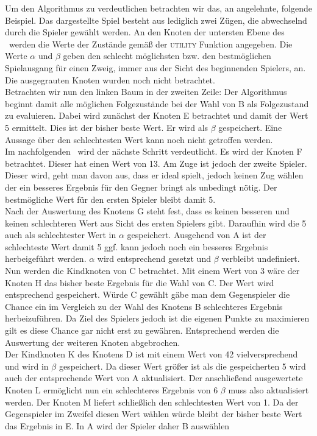 Um den Algorithmus zu verdeutlichen betrachten wir das, an \cite{Russell.2016} angelehnte, folgende Beispiel. Das dargestellte Spiel besteht aus lediglich zwei Zügen, die abwechselnd durch die Spieler gewählt werden. An den Knoten der untersten Ebene des \gtree\ werden die Werte der Zustände gemäß der \textsc{utility} Funktion angegeben. Die Werte $\alpha$ und $\beta$ geben den schlecht möglichsten bzw. den bestmöglichen Spielausgang für einen Zweig, immer aus der Sicht des beginnenden Spielers, an. Die ausgegrauten Knoten wurden noch nicht betrachtet.\\
Betrachten wir nun den linken Baum in der zweiten Zeile: Der Algorithmus beginnt damit alle möglichen Folgezustände bei der Wahl von B als Folgezustand zu evaluieren. Dabei wird zunächst der Knoten E betrachtet und damit der Wert 5 ermittelt. Dies ist der bisher beste Wert. Er wird als $\beta$ gespeichert. Eine Aussage über den schlechtesten Wert kann noch nicht getroffen werden.\\
Im nachfolgenden \gtree\ wird der nächste Schritt verdeutlicht. Es wird der Knoten F betrachtet. Dieser hat einen Wert von 13. Am Zuge ist jedoch der zweite Spieler. Dieser wird, geht man davon aus, dass er ideal spielt, jedoch keinen Zug wählen der ein besseres Ergebnis für den Gegner bringt als unbedingt nötig. Der bestmögliche Wert für den ersten Spieler bleibt damit 5.\\
Nach der Auswertung des Knotens G steht fest, dass es keinen besseren und keinen schlechteren Wert aus Sicht des ersten Spielers gibt. Daraufhin wird die 5 auch als schlechtester Wert in $\alpha$ gespeichert. Ausgehend von A  ist der schlechteste Wert damit 5 ggf. kann jedoch noch ein besseres Ergebnis herbeigeführt werden. $\alpha$ wird entsprechend gesetzt und $\beta$ verbleibt undefiniert.\\
Nun werden die Kindknoten von C betrachtet. Mit einem Wert von 3 wäre der Knoten H das bisher beste Ergebnis für die Wahl von C. Der Wert wird entsprechend gespeichert. Würde C gewählt gäbe man dem Gegenspieler die Chance ein im Vergleich zu der Wahl des Knotens B schlechteres Ergebnis herbeizuführen. Da Ziel des Spielers jedoch ist die eigenen Punkte zu maximieren gilt es diese Chance gar nicht erst zu gewähren. Entsprechend werden die Auswertung der weiteren Knoten abgebrochen.\\
Der Kindknoten K des Knotens D ist mit einem Wert von 42 vielversprechend und wird in $\beta$ gespeichert. Da dieser Wert größer ist als die gespeicherten 5 wird auch der entsprechende Wert von A aktualisiert. Der anschließend ausgewertete Knoten L ermöglicht nun ein schlechteres Ergebnis von 6 $\beta$ muss also aktualisiert werden. Der Knoten M liefert schließlich den schlechtesten Wert von 1. Da der Gegenspieler im Zweifel diesen Wert wählen würde bleibt der bisher beste Wert das Ergebnis in E. In A wird der Spieler daher B auswählen
